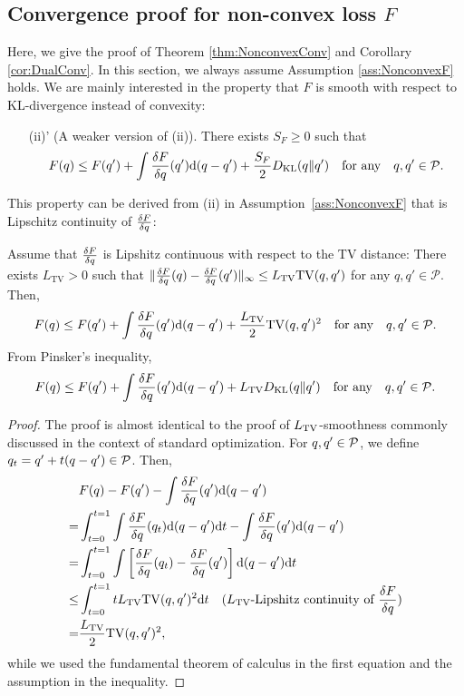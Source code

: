 \subsection{Convergence proof for non-convex loss $F$\label{section:da-nonconvex-proof}}


Here, we give the proof of Theorem \ref{thm:NonconvexConv} and Corollary \ref{cor:DualConv}. In this section, we always assume Assumption \ref{ass:NonconvexF} holds. We are mainly interested in the property that $F$ is smooth with respect to KL-divergence instead of convexity:
\begin{enumerate}
\item[(ii)'] (A weaker version of (ii)). There exists $S_F \geq 0$ such that 
\begin{equation}
    F(q) \leq F(q') + \int \frac{\delta F}{\delta q}(q')\mathrm{d}(q-q') + \frac{S_F}{2}D_{\mathrm{KL}}(q\|q') \quad \text{for any}\quad  q,q' \in {\mathcal{P}}. \label{eq:appendix-da-nonconvex-weak-smoothness}
\end{equation}
\end{enumerate}
This property can be derived from (ii) in Assumption~\ref{ass:NonconvexF} that is Lipschitz continuity of $\frac{\delta F}{\delta q}$:
\begin{lem}
    Assume that $\frac{\delta F}{\delta q}$ is Lipshitz continuous with respect to the TV distance: There exists $L_{\mathrm{TV}}  > 0$ such that $\|\frac{\delta F}{\delta q}(q) - \frac{\delta F}{\delta q}(q')\|_\infty \leq L_\mathrm{TV} \mathrm{TV}(q,q')$ for any $q,q' \in \mathcal{P}$. 
    Then, 
    \begin{equation}
        F(q) \leq F(q') + \int \frac{\delta F}{\delta q}(q')\mathrm{d}(q-q') + \frac{L_{\mathrm{TV}}}{2}\mathrm{TV}(q,q')^2 \quad \text{for any}\quad  q,q' \in {\mathcal{P}}.
    \end{equation}
    From Pinsker's inequality,
    \begin{equation}
        F(q) \leq F(q') + \int \frac{\delta F}{\delta q}(q')\mathrm{d}(q-q') + L_{\mathrm{TV}} D_{\mathrm{KL}}(q\|q') \quad \text{for any}\quad  q,q' \in {\mathcal{P}}.
    \end{equation}
\end{lem}
\begin{proof}
    The proof is almost identical to the proof of $L_{\mathrm{TV}}$-smoothness commonly discussed in the context of standard optimization.
    For $q,q'\in{\mathcal{P}}$, we define $q_t = q' + t (q-q') \in {\mathcal{P}}$. Then,
    \begin{align}
        &F(q) - F(q') - \int \frac{\delta F}{\delta q}(q')\mathrm{d}(q-q')\\
        = & \int_{t=0}^{t=1}  \int \frac{\delta F}{\delta q}(q_t) \mathrm{d}(q-q') \mathrm{d}t
        - \int \frac{\delta F}{\delta q}(q')\mathrm{d}(q-q')\\
        = & \int_{t=0}^{t=1}  \int \left[ \frac{\delta F}{\delta q}(q_t) - \frac{\delta F}{\delta q}(q') \right] \mathrm{d}(q-q') \mathrm{d}t\\
        \leq &  \int_{t=0}^{t=1} t L_{\mathrm{TV}} \mathrm{TV}(q,q')^2 \mathrm{d}t \quad (\text{$L_{\mathrm{TV}}$-Lipshitz continuity of $\frac{\delta F}{\delta q}$})\\
        = & \frac{L_{\mathrm{TV}}}{2}\mathrm{TV}(q,q')^2,
    \end{align}
    while we used the fundamental theorem of calculus in the first equation and the assumption in the inequality.
\end{proof}

